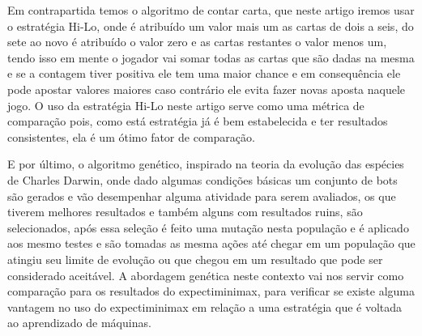     Em contrapartida temos o algoritmo de contar carta, que neste artigo iremos usar o estratégia Hi-Lo, onde é 
    atribuído um valor mais um as cartas de dois a seis, do sete ao novo é atribuído o valor zero e as cartas restantes 
    o valor menos um, tendo isso em mente o jogador vai somar todas as cartas que são dadas na mesma e se a contagem tiver 
    positiva ele tem uma maior chance e em consequência ele pode apostar valores maiores caso contrário ele evita fazer novas 
    aposta naquele jogo. O uso da estratégia Hi-Lo neste artigo serve como uma métrica de comparação pois, como está estratégia 
    já é bem estabelecida e ter resultados consistentes, ela é um ótimo fator de comparação. \cite{hi-lo-system} \cite{hi-lo-counting-card}

    E por último, o algoritmo genético, inspirado na teoria da evolução das espécies de Charles Darwin, onde dado algumas condições básicas 
    um conjunto de bots são gerados e vão desempenhar alguma atividade para serem avaliados, os que tiverem melhores resultados e também alguns com 
    resultados ruins, são selecionados, após essa seleção é feito uma mutação nesta população e é aplicado aos mesmo testes e são tomadas 
    as mesma ações até chegar em um população que atingiu seu limite de evolução ou que chegou em um resultado que pode ser considerado aceitável. 
    A abordagem genética neste contexto vai nos servir como comparação para os resultados do expectiminimax, para verificar se existe alguma vantagem
    no uso do expectiminimax em relação a uma estratégia que é voltada ao aprendizado de máquinas.   

    

    